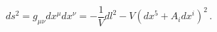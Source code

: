 \begin{equation}\label{(met)} 
ds^{2}=g_{\mu\nu}dx^{\mu}dx^{\nu}=-\frac{1}{V}dl^{2}-V(dx^{5}+
A_{i}dx^{i})^{2}\,.
\end{equation} 
